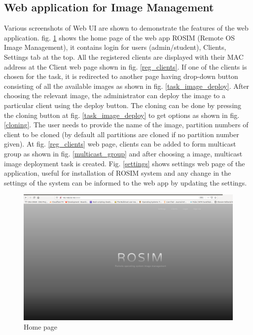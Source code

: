 \documentclass[a4paper,12pt]{article}
\begin{document}
\subsection{ Web application for Image Management }
Various screenshots of Web UI are shown to demonstrate the features of the web application. fig. \ref{home_page} shows the home page of the web app ROSIM (Remote OS Image Management), it contains login for users (admin/student), Clients, Settings tab at the top. All the registered clients are displayed with their MAC address at the Client web page shown in fig. \ref{reg_clients}. If one of the clients is chosen for the task, it is redirected to another page having drop-down button consisting of all the available images as shown in fig. \ref{task_image_deploy}. After choosing the relevant image, the administrator can deploy the image to a particular client using the deploy button. The cloning can be done by pressing the cloning button at fig. \ref{task_image_deploy} to get options as shown in fig. \ref{cloning}. The user needs to provide the name of the image, partition numbers of client to be cloned (by default all partitions are cloned if no partition number given). At fig. \ref{reg_clients}  web page, clients can be added to form multicast group as shown in fig. \ref{multicast_group} and after choosing a image, multicast image deployment task is created. Fig. \ref{settings} shows settings web page of the application, useful for installation of ROSIM system and any change in the settings of the system can be informed to the web app by updating the settings.
\begin{figure}
    \centering
    \includegraphics[width=\linewidth]{home_page.png}
    \caption{Home page}
    \label{home_page}
\end{figure}
\end{document}
